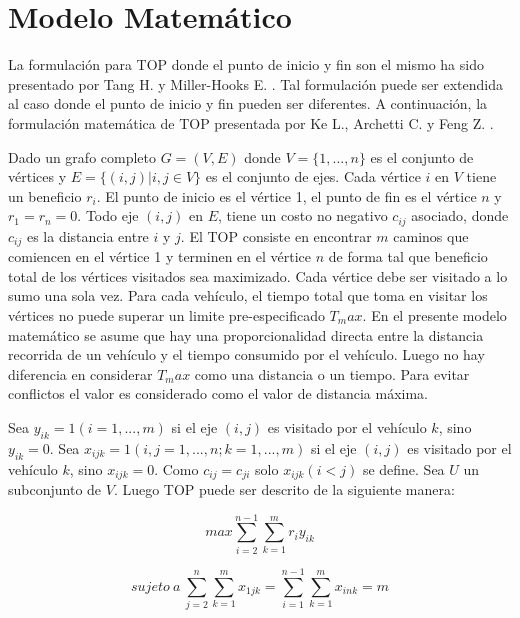 \chapter{Modelo Matemático}

La formulación para TOP donde el punto de inicio y fin son el mismo ha sido presentado por Tang H. y Miller-Hooks E. \cite{TangMillerHooks}. Tal formulación puede ser extendida al caso donde el punto de inicio y fin pueden ser diferentes. A continuación, la formulación matemática de TOP presentada por Ke L., Archetti C. y Feng Z. \cite{KeArchettiFeng}.

\bigskip

Dado un grafo completo $G=(V,E)$ donde $V=\{1,...,n\}$ es el conjunto de vértices y $E=\{(i,j)|i,j \in V\}$ es el conjunto de ejes. Cada vértice $i$ en $V$ tiene un beneficio $r_i$. El punto de inicio es el vértice 1, el punto de fin es el vértice $n$ y $r_1=r_n=0$. Todo eje $(i,j)$ en $E$, tiene un costo no negativo $c_{ij}$ asociado, donde $c_{ij}$ es la distancia entre $i$ y $j$. El TOP consiste en encontrar $m$ caminos que comiencen en el vértice 1 y terminen en el vértice $n$ de forma tal que beneficio total de los vértices visitados sea maximizado. Cada vértice debe ser visitado a lo sumo una sola vez. Para cada vehículo, el tiempo total que toma en visitar los vértices no puede superar un limite pre-especificado $T_max$. En el presente modelo matemático se asume que hay una proporcionalidad directa entre la distancia recorrida de un vehículo y el tiempo consumido por el vehículo. Luego no hay diferencia en considerar $T_max$ como una distancia o un tiempo. Para evitar conflictos el valor es considerado como el valor de distancia máxima.

\bigskip

Sea $y_{ik} = 1 (i = 1,...,m)$ si el eje $(i,j)$ es visitado por el vehículo $k$, sino $y_{ik} = 0$. Sea $x_{ijk} = 1 (i,j = 1,...,n; k=1,...,m)$ si el eje $(i,j)$ es visitado por el vehículo $k$, sino $x_{ijk} = 0$. Como $c_{ij}=c_{ji}$ solo $x_{ijk}(i<j)$ se define. Sea $U$ un subconjunto de $V$. Luego TOP puede ser descrito de la siguiente manera:

\bigskip

\begin{equation}
max \sum_{i=2}^{n-1} \sum_{k=1}^{m} r_i y_{ik}
\end{equation}

\begin{equation}
sujeto \ a \ \sum_{j=2}^{n} \sum_{k=1}^{m} x_{1jk} = \sum_{i=1}^{n-1} \sum_{k=1}^{m} x_{ink} = m
\end{equation}


